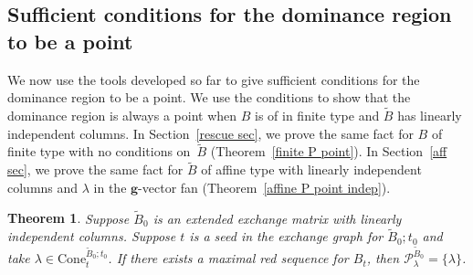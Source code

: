\documentclass{amsart}
\newtheorem{theorem}[proposition]{Theorem}
\theoremstyle{definition}
\theoremstyle{remark}
\numberwithin{equation}{section}
\newcommand{\set}[1]{{\lbrace #1 \rbrace}}
\newcommand{\0}{{\mathbf{0}}}
\newcommand{\Cone}{\mathrm{Cone}}
\newcommand{\g}{\mathbf{g}}
\newcommand{\tB}{{\tilde{B}}}
\renewcommand{\P}{\mathcal{P}}
\begin{document}
\subsection{Sufficient conditions for the dominance region to be a point}\label{point sec}  
We now use the tools developed so far to give sufficient conditions for the dominance region to be a point.
We use the conditions to show that the dominance region is always a point when $B$ is of in finite type and $\tB$ has linearly independent columns.
In Section~\ref{rescue sec}, we prove the same fact for $B$ of finite type with no conditions on~$\tB$ (Theorem~\ref{finite P point}).
In Section~\ref{aff sec}, we prove the same fact for $\tB$ of affine type with linearly independent columns and $\lambda$ in the $\g$-vector fan (Theorem~\ref{affine P point indep}). 

\begin{theorem}\label{P point}  
Suppose $\tB_0$ is an extended exchange matrix with linearly independent columns.
Suppose $t$ is a seed in the exchange graph for $\tB_0;t_0$ and take $\lambda\in\Cone^{\tB_0;t_0}_t$.
If there exists a maximal red sequence for $B_t$, then $\P^{\tB_0}_\lambda=\set{\lambda}$.
\end{theorem}
\end{document}
